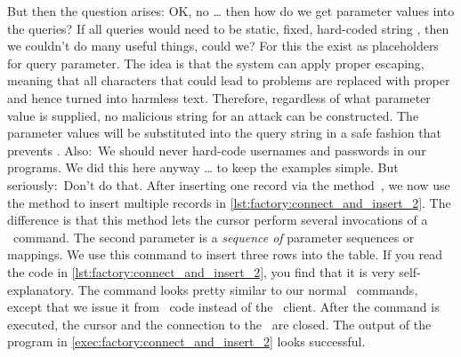 But then the question arises:
OK, no  {\dots} then how do we get parameter values into the queries?
If all queries would need to be static, fixed, hard-coded string , then we couldn't do many useful things, could we?
For this the  exist as placeholders for query parameter.
The idea is that the system can apply proper escaping, meaning that all characters that could lead to problems are replaced with proper  and hence turned into harmless text.
Therefore, regardless of what parameter value is supplied, no malicious string for an attack can be constructed.
The parameter values will be substituted into the query string in a safe fashion that prevents .%
%
%
%
Also:~We should never hard-code usernames and passwords in our programs.
We did this here anyway {\dots} to keep the examples simple.
But seriously:~Don't do that.%
\endhsection
%
%
%
%
%
After inserting one record via the method~, we now use the  method to insert multiple records in \cref{lst:factory:connect_and_insert_2}.
The difference is that this method lets the cursor perform several invocations of a \sql\ command.
The second parameter is a \emph{sequence of} parameter sequences or mappings.
We use this command to insert three rows into the  table.
If you read the code in \cref{lst:factory:connect_and_insert_2}, you find that it is very self-explanatory.
The command looks pretty similar to our normal \sql\ commands, except that we issue it from \python\ code instead of the \psql\ client.%
%
After the command is executed, the cursor and the connection to the \db\ are closed.
The output of the program in \cref{exec:factory:connect_and_insert_2} looks successful.%
\FloatBarrier%
\endhsection%
%
%
%
%
